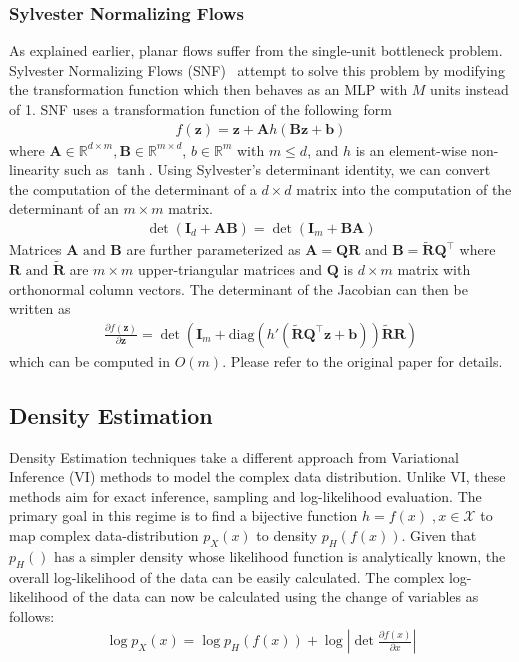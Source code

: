 \documentclass[runningheads]{llncs}
\begin{document}
\subsubsection{Sylvester Normalizing Flows} As explained earlier, planar flows suffer from the single-unit bottleneck problem. Sylvester Normalizing Flows (SNF)~\cite{van2018sylvester} attempt to solve this problem by modifying the transformation function which then behaves as an MLP with $M$ units instead of 1. SNF uses a transformation function of the following form 
\begin{align}
f(\mathbf{z}) = \mathbf{z} + \mathbf{A}h(\mathbf{B}\mathbf{z} + \mathbf{b})
\label{eq:sylfn}
\end{align}
where $\mathbf{A} \in \mathbb{R}^{d\times m},\mathbf{B} \in \mathbb{R}^{m \times d}$, $b \in \mathbb{R}^{m}$ with $m \leq d$, and $h$ is an element-wise non-linearity such as $\tanh$. Using Sylvester's determinant identity, we can convert the computation of the determinant of a $d \times d$ matrix into the computation of the determinant of an $m \times m$ matrix. 
\begin{align}
\det(\mathbf{I}_d + \mathbf{A}\mathbf{B}) = \det(\mathbf{I}_m + \mathbf{B}\mathbf{A})
\end{align}
Matrices $\mathbf{A}\text{ and }\mathbf{B}$ are further parameterized as $\mathbf{A} = \mathbf{Q}\mathbf{R}$ and $\mathbf{B} = \mathbf{\tilde{R}}\mathbf{Q}^\top$ where $\mathbf{R}\text{ and }\mathbf{\tilde{R}}$ are $m\times m$ upper-triangular matrices and $\mathbf{Q}$ is $d \times m $ matrix with orthonormal column vectors. The determinant of the Jacobian can then be written as
\begin{align}
\frac{\partial f(\mathbf{z})}{\partial \mathbf{z}} = \det \left(\mathbf{I}_m + \mathrm{diag}\left(h'(\mathbf{\tilde{R}}\mathbf{Q}^\top\mathbf{z} + \mathbf{b})\right)\mathbf{\tilde{R}}\mathbf{R}\right)
\end{align}
which can be computed in $O(m)$. Please refer to the original paper for details.

\subsection{Density Estimation}
Density Estimation techniques take a different approach from Variational Inference (VI) methods to model the complex data distribution. Unlike VI, these methods aim for exact inference, sampling and log-likelihood evaluation. The primary goal in this regime is to find a bijective function $h=f(x)\;,x \in \mathcal{X}$ to map complex data-distribution $p_X(x)$ to density $p_H(f(x))$. Given that $p_H()$ has a simpler density whose likelihood function is analytically known, the overall log-likelihood of the data can be easily calculated. The complex log-likelihood of the data can now be calculated using the change of variables as follows:
\begin{align}
\log p_X(x)  = \log p_H(f(x)) +
\log\left| \det\frac{\partial f(x)}{\partial x} \right| \label{eq:log-likelihood}
\end{align}
\end{document}

